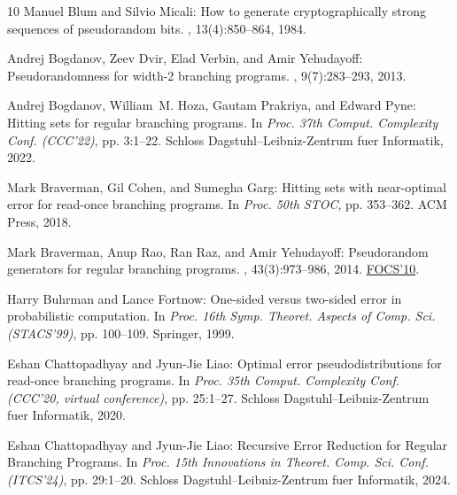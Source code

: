 \documentclass[11pt]{article}
\begin{document}
\begin{thebibliography}{10}
{\sc Manuel Blum and Silvio Micali}: How to generate cryptographically strong
  sequences of pseudorandom bits.
, 13(4):850--864, 1984.
\newblock [\epfmtdoi{10.1137/0213053}]

{\sc Andrej Bogdanov, Zeev Dvir, Elad Verbin, and Amir Yehudayoff}:
  Pseudorandomness for width-2 branching programs.
, 9(7):283--293, 2013.

{\sc Andrej Bogdanov, William~M. Hoza, Gautam Prakriya, and Edward Pyne}:
  Hitting sets for regular branching programs.
\newblock In {\em Proc. 37th Comput. Complexity Conf. (CCC'22)}, pp. 3:1--22.
  Schloss Dagstuhl--Leibniz-Zentrum fuer Informatik, 2022.

{\sc Mark Braverman, Gil Cohen, and Sumegha Garg}: Hitting sets with
  near-optimal error for read-once branching programs.
\newblock In {\em Proc. 50th STOC}, pp. 353--362. ACM Press, 2018.
\newblock [\epfmtdoi{10.1145/3188745.3188780}]

{\sc Mark Braverman, Anup Rao, Ran Raz, and Amir Yehudayoff}: Pseudorandom
  generators for regular branching programs.
, 43(3):973--986, 2014.
\newblock \prelim \href{https://doi.org/10.1109/FOCS.2010.11}{FOCS'10}.
\newblock [\epfmtdoi{10.1137/120875673}]

{\sc Harry Buhrman and Lance Fortnow}: One-sided versus two-sided error in
  probabilistic computation.
\newblock In {\em Proc. 16th Symp. Theoret. Aspects of Comp. Sci. (STACS'99)},
  pp. 100--109. Springer, 1999.
\newblock [\epfmtdoi{10.1007/3-540-49116-3\_9}]

{\sc Eshan Chattopadhyay and Jyun{-}Jie Liao}: Optimal error
  pseudodistributions for read-once branching programs.
\newblock In {\em Proc. 35th Comput. Complexity Conf. (CCC'20, virtual
  conference)}, pp. 25:1--27. Schloss Dagstuhl--Leibniz-Zentrum fuer
  Informatik, 2020.

{\sc Eshan Chattopadhyay and Jyun-Jie Liao}: {Recursive Error Reduction for
  Regular Branching Programs}.
\newblock In {\em Proc. 15th Innovations in Theoret. Comp. Sci. Conf.
  (ITCS'24)}, pp. 29:1--20. Schloss Dagstuhl--Leibniz-Zentrum fuer Informatik,
  2024.


\end{thebibliography}
\end{document}
